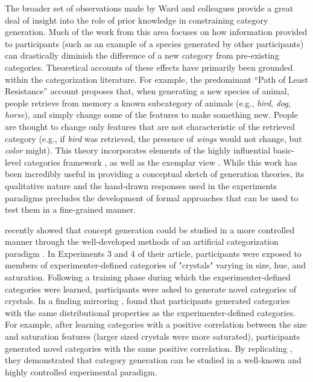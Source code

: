 \documentclass[12pt]{article}
\begin{document}
\begin{flushleft}
The broader set of observations made by Ward and colleagues provide a great deal
of insight into the role of prior knowledge in constraining category generation.
Much of the work from this area
\citep[e.g.,][]{smith1993constraining,marsh1999inadvertent} focuses on how
information provided to participants (such as an example of a species generated
by other participants) can drastically diminish the difference of a new category
from pre-existing categories. Theoretical accounts of these effects have
primarily been grounded within the categorization literature. For example, the
predominant ``Path of Least Resistance'' account
\citep[see][]{ward1994structured,ward1995s,ward2002role} proposes that, when
generating a new species of animal, people retrieve from memory a known
subcategory of animals (e.g., {\em bird}, {\em dog}, {\em horse}), and simply
change some of the features to make something new. People are thought to change
only features that are not characteristic of the retrieved category (e.g., if
{\em bird} was retrieved, the presence of {\em wings} would not change, but {\em
  color} might). This theory incorporates elements of the highly influential
basic-level categories framework \citep{rosch1975cognitive,rosch1976basic}, as
well as the exemplar view \citep{medin1978context,brooks1978nonanalytic}. While
this work has been incredibly useful in providing a conceptual sketch of
generation theories, its qualitative nature and the hand-drawn responses used in
the experiments paradigms precludes the development of formal approaches that
can be used to test them in a fine-grained manner.

\cite{jern2013probabilistic} recently showed that concept generation could be
studied in a more controlled manner through the well-developed methods of an
artificial categorization paradigm \citep[see][for a review]{kurtz2015human}. In
Experiments 3 and 4 of their article, participants were exposed to members of
experimenter-defined categories of "crystals" varying in size, hue, and
saturation. Following a training phase during which the experimenter-defined
categories were learned, participants were asked to generate novel categories of
crystals. In a finding mirroring \cite{ward1994structured},
\cite{jern2013probabilistic} found that participants generated categories with
the same distributional properties as the experimenter-defined categories. For
example, after learning categories with a positive correlation between the size
and saturation features (larger sized crystals were more saturated),
participants generated novel categories with the same positive correlation. By
replicating \cite{ward1994structured}, they demonstrated that category generation
can be studied in a well-known and highly controlled experimental paradigm.


\end{flushleft}
\end{document}
